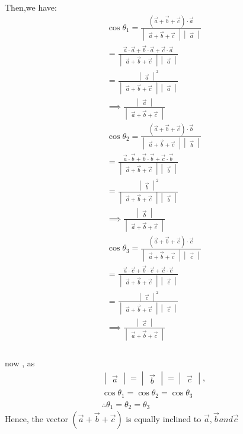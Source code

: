 \documentclass{article}
\providecommand{\brak}[1]{\ensuremath{\left(#1\right)}}
\newcommand{\mydet}[1]{\ensuremath{\begin{vmatrix}#1\end{vmatrix}}}
\begin{document}
\begin{enumerate}
    Then,we have:\\
    \begin{align}
        \cos{\theta_1}= \frac{\brak{\vec{a}+\vec{b}+\vec{c}} \cdot \vec{a}}{\mydet{\vec{a}+\vec{b}+\vec{c}}\mydet{\vec{a}}}\\
        =\frac{\vec{a} \cdot \vec{a} + \vec{b} \cdot \vec{a} + \vec{c} \cdot \vec{a}}{\mydet{\vec{a}+\vec{b}+\vec{c}}\mydet{\vec{a}}}\\
        =\frac{\mydet{\vec{a}}^2}{\mydet{\vec{a}+\vec{b}+\vec{c}}\mydet{\vec{a}}} \\
        \implies \frac{\mydet{\vec{a}}}{\mydet{\vec{a}+\vec{b}+\vec{c}}}
        \\ \cos{\theta_2}= \frac{\brak{\vec{a}+\vec{b}+\vec{c}} \cdot \vec{b}}{\mydet{\vec{a}+\vec{b}+\vec{c}}\mydet{\vec{b}}}\\
        =\frac{\vec{a} \cdot \vec{b} + \vec{b} \cdot \vec{b} + \vec{c} \cdot \vec{b}}{\mydet{\vec{a}+\vec{b}+\vec{c}}\mydet{\vec{b}}}\\
        =\frac{\mydet{\vec{b}}^2}{\mydet{\vec{a}+\vec{b}+\vec{c}}\mydet{\vec{b}}} \\
        \implies \frac{\mydet{\vec{b}}}{\mydet{\vec{a}+\vec{b}+\vec{c}}}\\
        \cos{\theta_3}= \frac{\brak{\vec{a}+\vec{b}+\vec{c}} \cdot \vec{c}}{\mydet{\vec{a}+\vec{b}+\vec{c}}\mydet{\vec{c}}}\\
        =\frac{\vec{a} \cdot \vec{c} + \vec{b} \cdot \vec{c} + \vec{c} \cdot \vec{c}}{\mydet{\vec{a}+\vec{b}+\vec{c}}\mydet{\vec{c}}}\\
        =\frac{\mydet{\vec{c}}^2}{\mydet{\vec{a}+\vec{b}+\vec{c}}\mydet{\vec{c}}} \\
        \implies \frac{\mydet{\vec{c}}}{\mydet{\vec{a}+\vec{b}+\vec{c}}}\\
    \end{align}\\
    now , as \begin{align}
        \mydet{\vec{a}} = \mydet{\vec{b}} = \mydet{\vec{c}},\\\cos{\theta_1} = \cos{\theta_2} = \cos{\theta_3}\\
        \therefore \theta_1=\theta_2=\theta_3
    \end{align}
    Hence, the vector $\brak{\vec{a}+\vec{b}+\vec{c}}$ is equally inclined to $\vec{a},\vec{b} and \vec{c}$
\end{enumerate}
\end{document}
